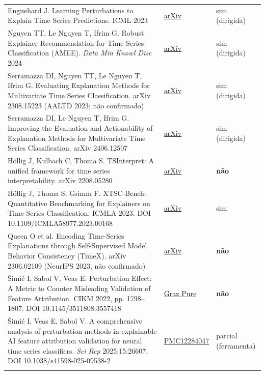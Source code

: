 \documentclass[11pt,a4paper]{article}
\begin{document}
{\begin{xltabular}{\linewidth}{>{\raggedright\arraybackslash}X>{\raggedright\arraybackslash}X>{\raggedright\arraybackslash}X}
Enguehard J. Learning Perturbations to Explain Time Series Predictions. ICML 2023 & \href{https://arxiv.org/abs/2305.18840}{arXiv} & sim (dirigida) \\ \addlinespace[1pt]
Nguyen TT, Le Nguyen T, Ifrim G. Robust Explainer Recommendation for Time Series Classification (AMEE). \textit{Data Min Knowl Disc} 2024 & \href{https://arxiv.org/abs/2306.05501}{arXiv} & sim (dirigida) \\ \addlinespace[1pt]
Serramazza DI, Nguyen TT, Le Nguyen T, Ifrim G. Evaluating Explanation Methods for Multivariate Time Series Classification. arXiv 2308.15223 (AALTD 2023; não confirmado) & \href{https://arxiv.org/abs/2308.15223}{arXiv} & sim (dirigida) \\ \addlinespace[1pt]
Serramazza DI, Le Nguyen T, Ifrim G. Improving the Evaluation and Actionability of Explanation Methods for Multivariate Time Series Classification. arXiv 2406.12507 & \href{https://arxiv.org/abs/2406.12507}{arXiv} & sim (dirigida) \\ \addlinespace[1pt]
Höllig J, Kulbach C, Thoma S. TSInterpret: A unified framework for time series interpretability. arXiv 2208.05280 & \href{https://arxiv.org/abs/2208.05280}{arXiv} & \textbf{não} \\ \addlinespace[1pt]
Höllig J, Thoma S, Grimm F. XTSC-Bench: Quantitative Benchmarking for Explainers on Time Series Classification. ICMLA 2023. DOI 10.1109/ICMLA58977.2023.00168 & \href{https://arxiv.org/abs/2310.14957}{arXiv} & sim \\ \addlinespace[1pt]
Queen O et al. Encoding Time-Series Explanations through Self-Supervised Model Behavior Consistency (TimeX). arXiv 2306.02109 (NeurIPS 2023, não confirmado) & \href{https://arxiv.org/abs/2306.02109}{arXiv} & \textbf{não} \\ \addlinespace[1pt]
Šimić I, Sabol V, Veas E. Perturbation Effect: A Metric to Counter Misleading Validation of Feature Attribution. CIKM 2022, pp. 1798–1807. DOI 10.1145/3511808.3557418 & \href{https://graz.elsevierpure.com/en/publications/perturbation-effect-a-metric-to-counter-misleading-validation-of-}{Graz Pure} & \textbf{não} \\ \addlinespace[1pt]
Šimić I, Veas E, Sabol V. A comprehensive analysis of perturbation methods in explainable AI feature attribution validation for neural time series classifiers. \textit{Sci Rep} 2025;15:26607. DOI 10.1038/s41598-025-09538-2 & \href{https://pmc.ncbi.nlm.nih.gov/articles/PMC12284047/}{PMC12284047} & parcial (ferramenta) \\ \addlinespace[1pt]

\end{xltabular}}
\end{document}
